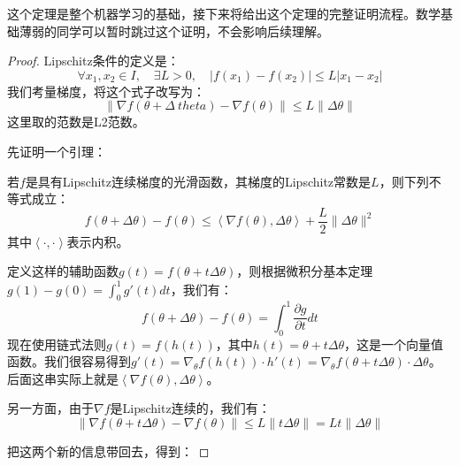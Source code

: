 这个定理是整个机器学习的基础，接下来将给出这个定理的完整证明流程。数学基础薄弱的同学可以暂时跳过这个证明，不会影响后续理解。
\begin{proof}
    Lipschitz条件的定义是：
    \[ \forall x_1, x_2 \in I,\quad \exists L > 0, \quad |f(x_1) - f(x_2)| \leq L |x_1 - x_2| \]
    我们考量梯度，将这个式子改写为：
    \begin{equation}
        \left\|\nabla f(\theta+\Delta \ theta) - \nabla f(\theta)\right\| \leq L \|\Delta \theta\|
    \end{equation}
    这里取的范数是L2范数。

    先证明一个引理：
    \begin{lemma}{}{}
        若$f$是具有Lipschitz连续梯度的光滑函数，其梯度的Lipschitz常数是$L$，则下列不等式成立：
        \[
            f(\theta+\Delta \theta)- f(\theta) \leq  \left\langle\nabla f(\theta), \Delta \theta \right\rangle + \frac{L}{2}\|\Delta \theta\|^2
        \]
        其中$\left\langle\cdot, \cdot\right\rangle$表示内积。
    \end{lemma}
    定义这样的辅助函数$g(t) = f(\theta + t\Delta \theta)$，则根据微积分基本定理$g(1) - g(0) = \int_0^1 g'(t) dt$，我们有：
    \[
        f(\theta+\Delta \theta) - f(\theta) = \int_0^1 \frac{\partial g}{\partial t} dt
    \]
    现在使用链式法则$g(t) = f(h(t))$，其中$h(t) = \theta + t\Delta \theta$，这是一个向量值函数。我们很容易得到$g'(t) = \nabla_\theta f(h(t)) \cdot h'(t) = \nabla_\theta f(\theta + t\Delta \theta) \cdot \Delta \theta$。后面这串实际上就是$\left\langle\nabla f(\theta), \Delta \theta \right\rangle$。

    另一方面，由于$\nabla f$是Lipschitz连续的，我们有：
    \[\|\nabla f(\theta + t\Delta \theta) - \nabla f(\theta)\| \leq L \|t\Delta \theta\| = Lt \|\Delta \theta\|\]

    把这两个新的信息带回去，得到：


\end{proof}
